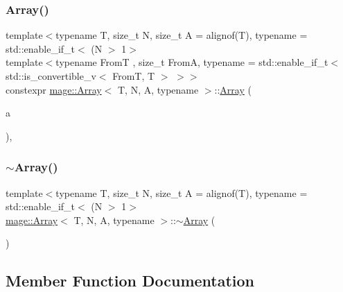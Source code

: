 \subsubsection{\texorpdfstring{Array()}{Array()}\hspace{0.1cm}{\footnotesize\ttfamily [10/10]}}
{\footnotesize\ttfamily template$<$typename T, size\+\_\+t N, size\+\_\+t A = alignof(\+T), typename  = std\+::enable\+\_\+if\+\_\+t$<$ (\+N $>$ 1$>$ \\
template$<$typename FromT , size\+\_\+t FromA, typename  = std\+::enable\+\_\+if\+\_\+t$<$ std\+::is\+\_\+convertible\+\_\+v$<$ From\+T, T $>$ $>$$>$ \\
constexpr \mbox{\hyperlink{structmage_1_1_array}{mage\+::\+Array}}$<$ T, N, A, typename $>$\+::\mbox{\hyperlink{structmage_1_1_array}{Array}} (\begin{DoxyParamCaption}\item[{const \mbox{\hyperlink{structmage_1_1_array}{Array}}$<$ FromT, N, FromA $>$ \&}]{a }\end{DoxyParamCaption})\hspace{0.3cm}{\ttfamily [explicit]}, {\ttfamily [noexcept]}}

\mbox{\label{structmage_1_1_array_a7adc09166915789b93a7a3af118182e0}} 
\subsubsection{\texorpdfstring{$\sim$\+Array()}{~Array()}}
{\footnotesize\ttfamily template$<$typename T, size\+\_\+t N, size\+\_\+t A = alignof(\+T), typename  = std\+::enable\+\_\+if\+\_\+t$<$ (\+N $>$ 1$>$ \\
\mbox{\hyperlink{structmage_1_1_array}{mage\+::\+Array}}$<$ T, N, A, typename $>$\+::$\sim$\mbox{\hyperlink{structmage_1_1_array}{Array}} (\begin{DoxyParamCaption}{ }\end{DoxyParamCaption})\hspace{0.3cm}{\ttfamily [default]}}



\subsection{Member Function Documentation}
\mbox{\label{structmage_1_1_array_a693f811869bcaae12b5308981682affa}} 

